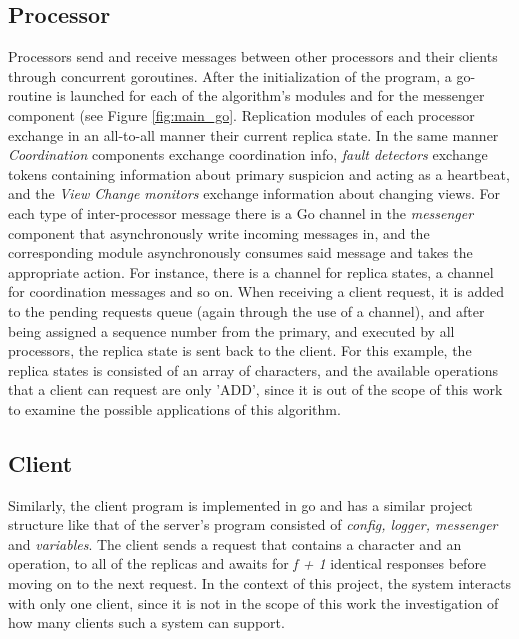 \documentclass[12pt,a4paper]{report}
\begin{document}
		    \subsection{Processor}
		    Processors send and receive messages between other processors and their clients through concurrent goroutines. After the initialization of the program, a go-routine is launched for each of the algorithm's modules and for the messenger component (see Figure \ref{fig:main_go}. Replication modules of each processor exchange in an all-to-all manner their current replica state. In the same manner \textit{Coordination} components exchange coordination info, \textit{fault detectors} exchange tokens containing information about primary suspicion and acting as a heartbeat, and the \textit{View Change monitors}  exchange information about changing views. For each type of inter-processor message there is a Go channel in the \textit{messenger} component that asynchronously write incoming messages in, and the corresponding module asynchronously consumes said message and takes the appropriate action. For instance, there is a channel for replica states, a channel for coordination messages and so on. When receiving a client request, it is added to the pending requests queue (again through the use of a channel), and after being assigned a sequence number from the primary, and executed by all processors, the replica state is sent back to the client. For this example, the replica states is consisted of an array of characters, and the available operations that a client can request are only 'ADD', since it is out of the scope of this work to examine the possible applications of this algorithm.
		    
		    \subsection{Client}
		    Similarly, the client program is implemented in go and has a similar project structure like that of the server's program consisted of \textit{config, logger, messenger} and \textit{variables}. The client sends a request that contains a character and an operation, to all of the replicas and awaits for \textit{f + 1} identical responses before moving on to the next request. In the context of this project, the system interacts with only one client, since it is not in the scope of this work the investigation of how many clients such a system can support.
		    
		    		
\end{document}
